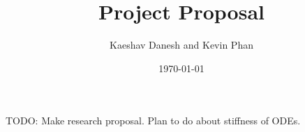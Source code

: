 \documentclass[12pt]{article}
\title{Project Proposal}
\author{Kaeshav Danesh and Kevin Phan}
\date{\today}
\begin{document}
	
	\maketitle
    TODO: Make research proposal. Plan to do about stiffness of ODEs. 
\end{document}
